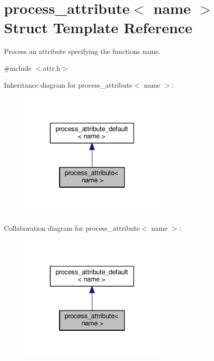 \hypertarget{structprocess__attribute_3_01name_01_4}{}\section{process\+\_\+attribute$<$ name $>$ Struct Template Reference}
\label{structprocess__attribute_3_01name_01_4}


Process an attribute specifying the function\textquotesingle{}s name.  




{\ttfamily \#include $<$attr.\+h$>$}



Inheritance diagram for process\+\_\+attribute$<$ name $>$\+:
\nopagebreak
\begin{figure}[H]
\begin{center}
\leavevmode
\includegraphics[width=206pt]{structprocess__attribute_3_01name_01_4__inherit__graph}
\end{center}
\end{figure}


Collaboration diagram for process\+\_\+attribute$<$ name $>$\+:
\nopagebreak
\begin{figure}[H]
\begin{center}
\leavevmode
\includegraphics[width=206pt]{structprocess__attribute_3_01name_01_4__coll__graph}
\end{center}
\end{figure}
